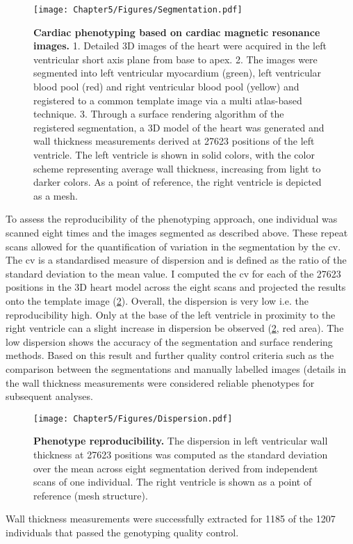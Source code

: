 \begin{figure}[h]
	\centering
	\texttt{[image: Chapter5/Figures/Segmentation.pdf]}
	\caption[\textbf{Cardiac phenotyping based on cardiac magnetic resonance images. }]{\textbf{Cardiac phenotyping based on cardiac magnetic resonance images. }1. Detailed 3D images of the heart were acquired in the left ventricular short axis plane from base to apex. 2. The images were segmented into left ventricular myocardium (green), left ventricular blood pool (red) and right ventricular blood pool (yellow) and registered to a common template image via a multi atlas-based technique. 3. Through a surface rendering algorithm of the registered segmentation, a 3D model of the heart was generated and wall thickness measurements derived at \num{27623} positions of the left ventricle. The left ventricle is shown in solid colors, with the color scheme representing average wall thickness, increasing from light to darker colors. As a point of reference, the right ventricle is depicted as a mesh.}
 	\label{fig:segmentation}
\end{figure}
%
To assess the reproducibility of the phenotyping approach, one individual was scanned eight times and the images segmented as described above. These repeat scans allowed for the quantification of variation in the segmentation by the \gls{cv}. The \gls{cv} is a standardised measure of dispersion and is defined as the ratio of the standard deviation to the mean value. I computed the \gls{cv} for each of the \num{27623} positions in the 3D heart model across the eight scans and projected the results onto the template image (\cref{fig:reproducibility}). Overall, the dispersion is very low i.e. the reproducibility high. Only at the base of the left ventricle in proximity to the right ventricle can a slight increase in dispersion be observed (\cref{fig:reproducibility}, red area). The low dispersion shows the accuracy of the segmentation and surface rendering methods. Based on this result and further quality control criteria such as the comparison between the segmentations and manually labelled images (details in \citep{deMarvao2014} the wall thickness measurements were considered reliable phenotypes for subsequent analyses. 
\\ 

\begin{figure}[h]
	\centering
	\texttt{[image: Chapter5/Figures/Dispersion.pdf]}
	\caption[\textbf{Phenotype reproducibility. }]{\textbf{Phenotype reproducibility. }The dispersion in left ventricular wall thickness at \num{27623} positions was computed as the standard deviation over the mean across eight segmentation derived from independent scans of one individual. The right ventricle is shown as a point of reference (mesh structure). }
 	\label{fig:reproducibility}
\end{figure}
%

Wall thickness measurements were successfully extracted for \num{1185} of the \num{1207} individuals that passed the genotyping quality control. 


%